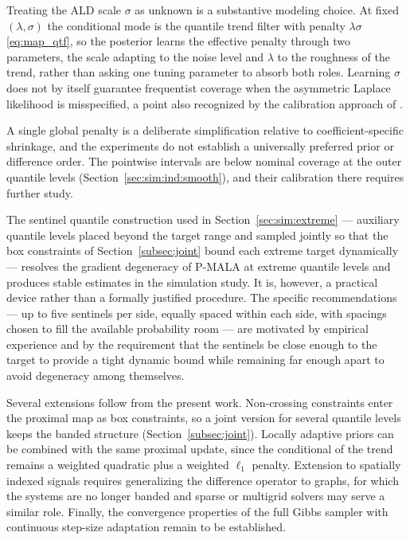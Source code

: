 Treating the ALD scale $\sigma$ as unknown is a substantive modeling choice. At fixed $(\lambda, \sigma)$ the conditional mode is the quantile trend filter with penalty $\lambda\sigma$ \eqref{eq:map_qtf}, so the posterior learns the effective penalty through two parameters, the scale adapting to the noise level and $\lambda$ to the roughness of the trend, rather than asking one tuning parameter to absorb both roles. Learning $\sigma$ does not by itself guarantee frequentist coverage when the asymmetric Laplace likelihood is misspecified, a point also recognized by the calibration approach of \citet{onizuka2024fast}.

A single global penalty is a deliberate simplification relative to coefficient-specific shrinkage, and the experiments do not establish a universally preferred prior or difference order. The pointwise intervals are below nominal coverage at the outer quantile levels (Section~\ref{sec:sim:ind:smooth}), and their calibration there requires further study.

The sentinel quantile construction used in Section~\ref{sec:sim:extreme} --- auxiliary quantile levels placed beyond the target range and sampled jointly so that the box constraints of Section~\ref{subsec:joint} bound each extreme target dynamically --- resolves the gradient degeneracy of P-MALA at extreme quantile levels and produces stable estimates in the simulation study. It is, however, a practical device rather than a formally justified procedure. The specific recommendations --- up to five sentinels per side, equally spaced within each side, with spacings chosen to fill the available probability room --- are motivated by empirical experience and by the requirement that the sentinels be close enough to the target to provide a tight dynamic bound while remaining far enough apart to avoid degeneracy among themselves.

Several extensions follow from the present work. Non-crossing constraints enter the proximal map as box constraints, so a joint version for several quantile levels keeps the banded structure (Section~\ref{subsec:joint}). Locally adaptive priors can be combined with the same proximal update, since the conditional of the trend remains a weighted quadratic plus a weighted $\ell_1$ penalty. Extension to spatially indexed signals requires generalizing the difference operator to graphs, for which the systems are no longer banded and sparse or multigrid solvers may serve a similar role. Finally, the convergence properties of the full Gibbs sampler with continuous step-size adaptation remain to be established.
